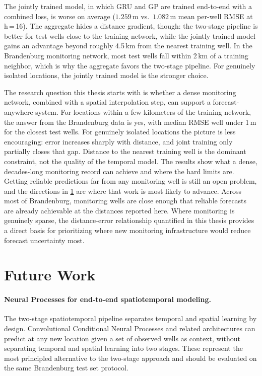 The jointly trained model, in which GRU and GP are trained end-to-end with a combined loss, is worse on average ($1.259$\,m vs.\ $1.082$\,m mean per-well RMSE at h\,=\,16). The aggregate hides a distance gradient, though: the two-stage pipeline is better for test wells close to the training network, while the jointly trained model gains an advantage beyond roughly 4.5\,km from the nearest training well. In the Brandenburg monitoring network, most test wells fall within 2\,km of a training neighbor, which is why the aggregate favors the two-stage pipeline. For genuinely isolated locations, the jointly trained model is the stronger choice.

The research question this thesis starts with is whether a dense monitoring network, combined with a spatial interpolation step, can support a forecast-anywhere system. For locations within a few kilometers of the training network, the answer from the Brandenburg data is yes, with median RMSE well under 1\,m for the closest test wells. For genuinely isolated locations the picture is less encouraging: error increases sharply with distance, and joint training only partially closes that gap. Distance to the nearest training well is the dominant constraint, not the quality of the temporal model. The results show what a dense, decades-long monitoring record can achieve and where the hard limits are. Getting reliable predictions far from any monitoring well is still an open problem, and the directions in \cref{sec:future_work} are where that work is most likely to advance. Across most of Brandenburg, monitoring wells are close enough that reliable forecasts are already achievable at the distances reported here. Where monitoring is genuinely sparse, the distance-error relationship quantified in this thesis provides a direct basis for prioritizing where new monitoring infrastructure would reduce forecast uncertainty most.

\section{Future Work}
\label{sec:future_work}

\paragraph{Neural Processes for end-to-end spatiotemporal modeling.}
The two-stage spatiotemporal pipeline separates temporal and spatial learning by design. Convolutional
Conditional Neural Processes \citep{gordon2020convolutional} and related architectures can predict at any new location given a set of observed wells as context, without separating temporal and spatial learning into two stages. These represent the
most principled alternative to the two-stage approach and should be evaluated on the same
Brandenburg test set protocol.

